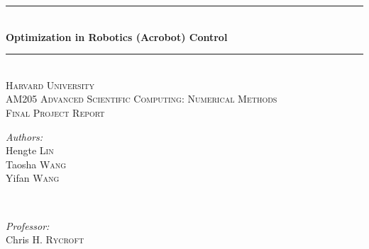 \begin{titlepage}

\newcommand{\HRule}{\rule{\linewidth}{0.5mm}} %

\center %
 
\HRule \\[0.4cm]
{\Large \bfseries Optimization in Robotics (Acrobot) Control}\\[0.4cm] %
\HRule \\[1.2cm]


\textsc{\LARGE Harvard University}\\[1.2cm] %
\textsc{\Large AM205 Advanced Scientific Computing: Numerical Methods}\\[0.8cm] %
\textsc{\large Final Project Report}\\[1.2cm] %



\begin{minipage}{0.4\textwidth}
\begin{flushleft} \large
\emph{Authors:}\\
Hengte \textsc{Lin} \\%
Taosha \textsc{Wang}\\
Yifan \textsc{Wang}\\
\end{flushleft}
\end{minipage}
~
\begin{minipage}{0.4\textwidth}
\begin{flushright} \large
\emph{Professor:} \\

Chris H. \textsc{Rycroft} %
\end{flushright}
\end{minipage}\\[1cm]


\end{titlepage}

